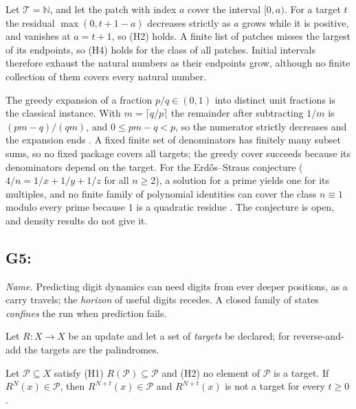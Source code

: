 \begin{example}\label{ex:G4-intervals}
Let $\mathcal T = \mathbb{N}$, and let the patch with index $a$ cover the interval $[0, a)$. For a
target $t$ the residual $\max(0, t + 1 - a)$ decreases strictly as $a$ grows while it is positive,
and vanishes at $a = t + 1$, so (H2) holds. A finite list of patches misses the largest of its
endpoints, so (H4) holds for the class of all patches. Initial intervals therefore exhaust the
natural numbers as their endpoints grow, although no finite collection of them covers every natural
number.
\end{example}

The greedy expansion of a fraction $p/q \in (0,1)$ into distinct unit fractions is the classical
instance. With $m = \lceil q/p \rceil$ the remainder after subtracting $1/m$ is $(pm - q)/(qm)$,
and $0 \le pm - q < p$, so the numerator strictly decreases and the expansion ends
\citep{Sylvester1880}. A fixed finite set of denominators has finitely many subset sums, so no fixed
package covers all targets; the greedy cover succeeds because its denominators depend on the
target. For the Erd\H{o}s--Straus conjecture ($4/n = 1/x + 1/y + 1/z$ for all $n \ge 2$), a
solution for a prime yields one for its multiples, and no finite family of polynomial identities can
cover the class $n \equiv 1$ modulo every prime because $1$ is a quadratic residue
\citep{Mordell1969}. The conjecture is open, and density results
\citep{Vaughan1970,ElsholtzTao2013} do not give it.

\subsection{G5: \lawGFive}\label{sec:G5}

\emph{Name.} Predicting digit dynamics can need digits from ever deeper positions, as a carry
travels; the \emph{horizon} of useful digits recedes. A closed family of states \emph{confines} the
run when prediction fails.

Let $R : X \to X$ be an update and let a set of \emph{targets} be declared; for reverse-and-add the
targets are the palindromes.

\begin{theorem}\label{thm:G5}
Let $\mathcal P \subseteq X$ satisfy \textup{(H1)} $R(\mathcal P) \subseteq \mathcal P$ and
\textup{(H2)} no element of $\mathcal P$ is a target. If $R^N(x) \in \mathcal P$, then
$R^{N+t}(x) \in \mathcal P$ and $R^{N+t}(x)$ is not a target for every $t \ge 0$.
\end{theorem}

